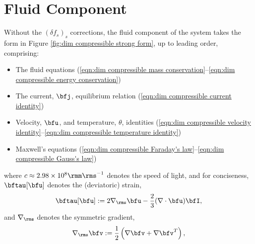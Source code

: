 \chapter{Fluid Component}

     Without the $(\delta f_{s})_{s}$ corrections, the fluid component of the system takes the form in Figure \ref{fig:dim compressible strong form}, up to leading order, comprising:
    \begin{itemize}
        \item  The fluid equations (\ref{eqn:dim compressible mass conservation}–\ref{eqn:dim compressible energy conservation})
        \item  The current, $\bfj$, equilibrium relation (\ref{eqn:dim compressible current identity})
        \item  Velocity, $\bfu$, and temperature, $\theta$, identities (\ref{eqn:dim compressible velocity identity}–\ref{eqn:dim compressible temperature identity})
        \item  Maxwell's equations (\ref{eqn:dim compressible Faraday's law}–\ref{eqn:dim compressible Gauss's law})
    \end{itemize}
    where $c \approx 2.98\times 10^{8}\rmm\rms^{- 1}$ denotes the speed of light, and for conciseness, $\bftau[\bfu]$ denotes the (deviatoric) strain,
    \begin{equation}\label{eqn:strain equation}
        \bftau[\bfu]  :=  2\nabla_{\rms}\bfu - \frac{2}{3}(\nabla\cdot\bfu)\bfI,
    \end{equation}
    and $\nabla_{\rms}$ denotes the symmetric gradient,
    \begin{equation}
        \nabla_{\rms}\bfv  :=  \frac{1}{2}\left(\nabla\bfv + \nabla\bfv^{T}\right),
    \end{equation}

